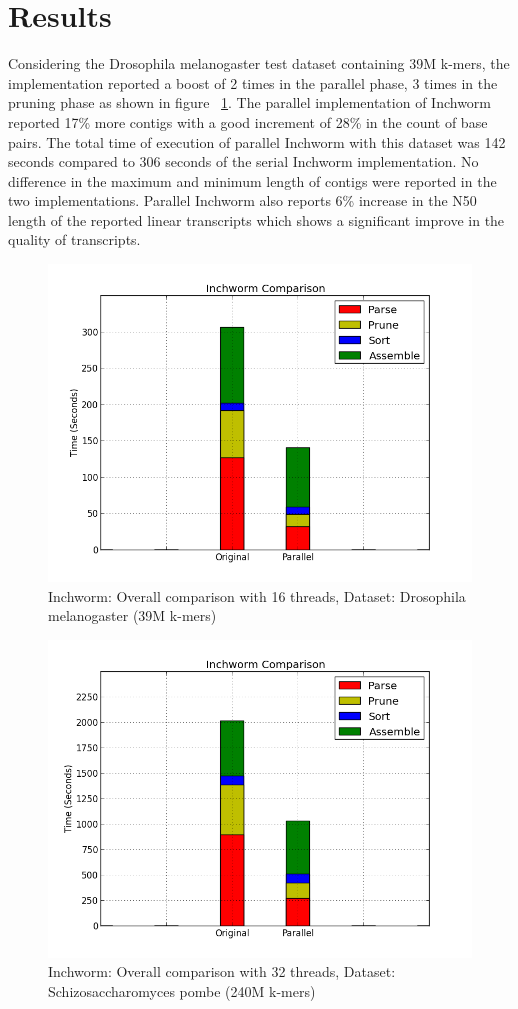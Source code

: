 \label{key}\documentclass[bachinf, english ,zihtitle,final,hyperref,utf8]{zihpub}
\begin{document}
\section{Results}
Considering the Drosophila melanogaster test dataset containing 39M k-mers, the implementation reported a boost of 2 times in the parallel phase, 3 times in the pruning phase as shown in figure ~\ref{drozo}. The parallel implementation of Inchworm reported 17\% more contigs with a good increment of 28\% in the count of base pairs. The total time of execution of parallel Inchworm with this dataset was 142 seconds compared to 306 seconds of the serial Inchworm implementation. No difference in the maximum and minimum length of contigs were reported in the two implementations. Parallel Inchworm also reports 6\% increase in the N50 length of the reported linear transcripts which shows a significant improve in the quality of transcripts. 
\begin{figure}[h]
\center
\includegraphics[scale=0.45]{inch_compare}
\caption{Inchworm: Overall comparison with 16 threads, Dataset: Drosophila melanogaster (39M k-mers)}
\label{drozo}
\end{figure}
\begin{figure}[h]
\center
\includegraphics[scale=0.45]{compare-Inchworm-schizo}
\caption{Inchworm: Overall comparison with 32 threads, Dataset: Schizosaccharomyces pombe (240M k-mers)}
\label{schizo}
\end{figure}
\end{document}
